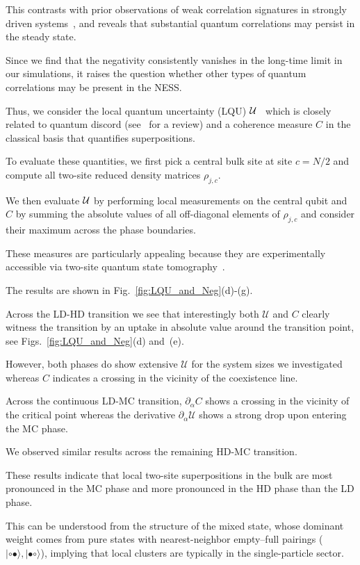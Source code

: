 \documentclass[aps,prl,twocolumn,groupedaddress,superscriptaddress,colorlinks,bookmarks=false,citecolor=darkspringgreen,linkcolor=darkolivegreen,urlcolor=navyblue]{revtex4-1}
\newcommand{\kett}[1]{\lvert #1 \rangle}
\begin{document}
This contrasts with prior observations of weak correlation signatures in strongly driven systems~\cite{Temme_2012}, and reveals that substantial quantum correlations may persist in the steady state.


Since we find that the negativity consistently vanishes in the long-time limit in our simulations, it raises the question whether other types of quantum correlations may be present in the NESS.

Thus, we consider the local quantum uncertainty (LQU) ${\cal U}$~\cite{Giro13} which is closely related to quantum discord (see~\cite{Bera18} for a review) and a coherence measure $C$ in the classical basis that quantifies superpositions.

To evaluate these quantities, we first pick a central bulk site at site $c=N/2$ and compute all two-site reduced density matrices $\rho_{j,c}$.

We then evaluate ${\cal U}$ by performing local measurements on the central qubit and $C$ by summing the absolute values of all off-diagonal elements of  $\rho_{j,c}$ and consider their maximum across the phase boundaries.

These measures are particularly appealing because they are experimentally accessible via two-site quantum state tomography~\cite{QSE,Auc11,Kim23,Ram21}.


The results are shown in Fig.~\ref{fig:LQU_and_Neg}(d)-(g).

Across the LD-HD transition we see that interestingly both $\mathcal{U}$ and $C$ clearly witness the transition by an uptake in absolute value around the transition point, see Figs.~\ref{fig:LQU_and_Neg}(d) and~(e).

However, both phases do show extensive $\mathcal{U}$ for the system sizes we investigated whereas $C$ indicates a crossing in the vicinity of the coexistence line.

Across the continuous LD-MC transition, $\partial_\alpha C$ shows a crossing in the vicinity of the critical point whereas the derivative $\partial_{\alpha}\mathcal{U}$ shows a strong drop upon entering the MC phase.

We observed similar results across the remaining HD-MC transition.

These results indicate that local two-site superpositions in the bulk are most pronounced in the MC phase and more pronounced in the HD phase than the LD phase.

This can be understood from the structure of the mixed state, whose dominant weight comes from pure states with nearest-neighbor empty–full pairings ($\kett{\circ\bullet},\kett{\bullet\circ}$), implying that local clusters are typically in the single-particle sector.
\end{document}

